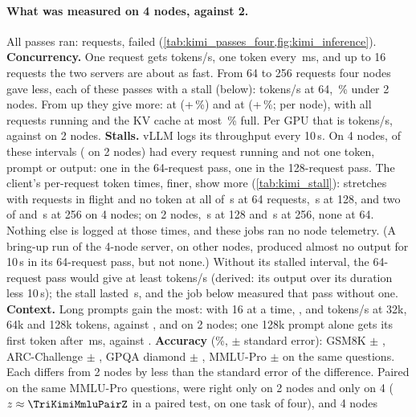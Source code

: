 \paragraph{What was measured on 4 nodes, against 2.} All \TriKimiFourPasses{} passes ran: \TriKimiFourRequests{} requests, \TriKimiFourFailed{} failed (\cref{tab:kimi_passes_four,fig:kimi_inference}). \textbf{Concurrency.} One request gets \TriKimiFourOneTok{} tokens/s, one token every \TriKimiFourOneTpot\,ms, and up to 16 requests the two servers are about as fast. From 64 to 256 requests four nodes gave less, each of these passes with a stall (below): \TriKimiFourSixtyFourTok{} tokens/s at 64, \TriKimiFourSixtyFourPct\,\% under 2 nodes. From \TriKimiPeakConc{} up they give more: \TriKimiFourFiveTwelveTok{} at \TriKimiPeakConc{} (+\TriKimiFourFiveTwelvePct\,\%) and \TriKimiFourTopTok{} at \TriKimiTopConc{} (+\TriKimiFourTopPct\,\%; \TriKimiFourTopNode{} per node), with all \TriKimiTopConc{} requests running and the KV cache at most \TriKimiFourKvUsePct\,\% full. Per GPU that is \TriKimiFourTopGpu{} tokens/s, against \TriKimiPeakGpu{} on 2 nodes. \textbf{Stalls.} vLLM logs its throughput every 10\,s. On 4 nodes, \TriKimiFourStalls{} of these intervals (\TriKimiStalls{} on 2 nodes) had every request running and not one token, prompt or output: one in the 64-request pass, one in the 128-request pass. The client's per-request token times, finer, show more (\cref{tab:kimi_stall}): stretches with requests in flight and no token at all of \TriKstallFourSixtyFourStall\,s at 64 requests, \TriKstallFourOneTwentyEightStall\,s at 128, and two of \TriKstallFourTwoFiftySixStall{} and \TriKstallFourTwoFiftySixStallSecond\,s at 256 on 4 nodes; on 2 nodes, \TriKstallTwoOneTwentyEightStall\,s at 128 and \TriKstallTwoTwoFiftySixStall\,s at 256, none at 64. Nothing else is logged at those times, and these jobs ran no node telemetry. (A bring-up run of the 4-node server, on other nodes, produced almost no output for 10\,s in its 64-request pass, but not none.) Without its stalled interval, the 64-request pass would give at least \TriKimiFourSixtyFourNoStall{} tokens/s (derived: its output over its duration less 10\,s); the stall lasted \TriKstallFourSixtyFourStall\,s, and the job below measured that pass without one. \textbf{Context.} Long prompts gain the most: with 16 at a time, \TriKimiFourCtxSixteenTokThirtyTwo, \TriKimiFourCtxSixteenTokSixtyFour{} and \TriKimiFourCtxSixteenTok{} tokens/s at 32k, 64k and 128k tokens, against \TriKimiCtxSixteenTokThirtyTwo, \TriKimiCtxSixteenTokSixtyFour{} and \TriKimiCtxSixteenTok{} on 2 nodes; one 128k prompt alone gets its first token after \TriKimiFourCtxTtft\,ms, against \TriKimiCtxTtft. \textbf{Accuracy} (\%, $\pm$ standard error): GSM8K \TriKimiFourGsm{} $\pm$ \TriKimiFourGsmErr, ARC-Challenge \TriKimiFourArc{} $\pm$ \TriKimiFourArcErr, GPQA diamond \TriKimiFourGpqa{} $\pm$ \TriKimiFourGpqaErr, MMLU-Pro \TriKimiFourMmlu{} $\pm$ \TriKimiFourMmluErr{} on the same \TriKimiFourMmluN{} questions. Each differs from 2 nodes by less than the standard error of the difference. Paired on the same MMLU-Pro questions, \TriKimiMmluOnlyTwo{} were right only on 2 nodes and \TriKimiMmluOnlyFour{} only on 4 ($z \approx \TriKimiMmluPairZ$ in a paired test, on one task of four), and 4 nodes 